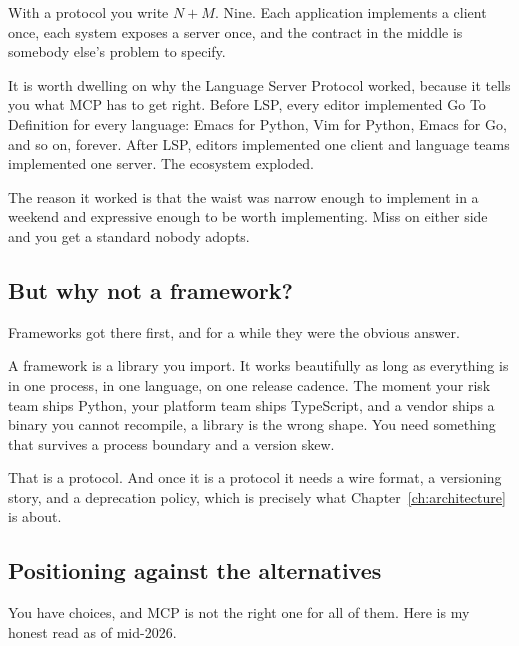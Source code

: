 With a protocol you write $N + M$. Nine. Each application implements a client
once, each system exposes a server once, and the contract in the middle is
somebody else's problem to specify.

It is worth dwelling on why the Language Server Protocol worked, because it
tells you what MCP has to get right. Before LSP, every editor implemented Go To
Definition for every language: Emacs for Python, Vim for Python, Emacs for Go,
and so on, forever. After LSP, editors implemented one client and language teams
implemented one server. The ecosystem exploded.

The reason it worked is that the waist was narrow enough to implement in a
weekend and expressive enough to be worth implementing. Miss on either side and
you get a standard nobody adopts.

\subsection{But why not a framework?}

Frameworks got there first, and for a while they were the obvious answer.

A framework is a library you import. It works beautifully as long as everything
is in one process, in one language, on one release cadence. The moment your risk
team ships Python, your platform team ships TypeScript, and a vendor ships a
binary you cannot recompile, a library is the wrong shape. You need something
that survives a process boundary and a version skew.

That is a protocol. And once it is a protocol it needs a wire format, a
versioning story, and a deprecation policy, which is precisely what
Chapter~\ref{ch:architecture} is about.

\subsection{Positioning against the alternatives}

You have choices, and MCP is not the right one for all of them. Here is my
honest read as of mid-2026.

